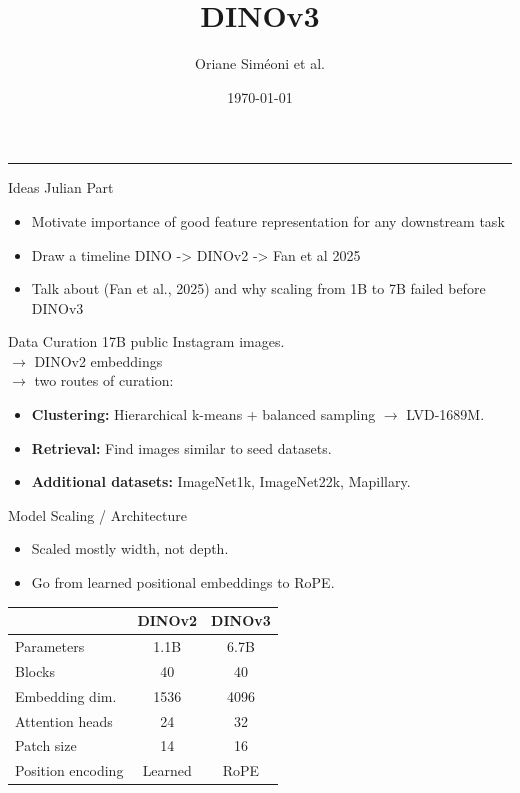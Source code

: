 \documentclass[aspectratio=169,11pt]{beamer}
\begin{document}
\title{DINOv3}
\author{Oriane Siméoni et al.}
\date{\today}


{
\begin{frame}[plain]
  \vspace{0.8cm}
  \titlepage
  \vfill
  {\color{Accent}\rule{2.2cm}{2pt}}
\end{frame}
}


\begin{frame}{Ideas Julian Part}
\begin{itemize}
    \item Motivate importance of good feature representation for any downstream task
    \item Draw a timeline DINO -> DINOv2 -> Fan et al 2025
    \item Talk about (Fan et al., 2025) and why scaling from 1B to 7B failed before DINOv3
\end{itemize}
\end{frame}

\begin{frame}{Data Curation}
    17B public Instagram images.\\
    $\rightarrow$ DINOv2 embeddings\\
    $\rightarrow$ two routes of curation:

    \begin{itemize}
        \item \textbf{Clustering:} Hierarchical k-means + balanced sampling $\rightarrow$ LVD-1689M.
        \item \textbf{Retrieval:} Find images similar to seed datasets.
        \item \textbf{Additional datasets:} ImageNet1k, ImageNet22k, Mapillary.
    \end{itemize}


\end{frame}

\begin{frame}{Model Scaling / Architecture}
\begin{itemize}
    \item Scaled mostly width, not depth.
    \item Go from learned positional embeddings to RoPE.
\end{itemize}
\begin{table}[h]
\centering
\begin{tabular}{lcc}
\hline
 & \textbf{DINOv2} & \textbf{DINOv3} \\
\hline
Parameters & 1.1B & 6.7B \\
Blocks & 40 & 40 \\
Embedding dim. & 1536 & 4096 \\
Attention heads & 24 & 32 \\
Patch size & 14 & 16 \\
Position encoding & Learned & RoPE \\
\hline
\end{tabular}
\end{table}
\end{frame}
\end{document}
